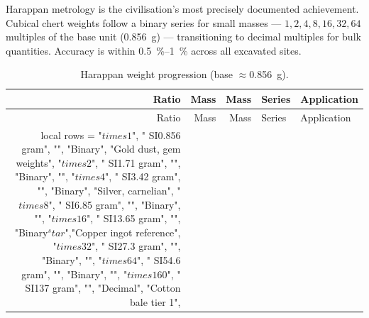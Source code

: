 Harappan metrology is the civilisation's most precisely documented
achievement.\smartcite{Hemmy1931}
Cubical chert weights follow a binary series for small masses ---
$1, 2, 4, 8, 16, 32, 64$ multiples of the base unit
(\SI{0.856}{\gram}) --- transitioning to decimal multiples for
bulk quantities.
Accuracy is within \SIrange{0.5}{1}{\percent} across all excavated
sites.\smartcite{Kenoyer2010}

\begin{longtable}{@{}rrrll@{}}
\caption{Harappan weight progression (base $\approx$\SI{0.856}{\gram}).}
\label{tab:weights}\\
\toprule
Ratio & Mass & Mass & Series & Application \\
\midrule
\endfirsthead
\toprule
Ratio & Mass & Mass & Series & Application \\
\midrule
\endhead
\bottomrule
\endlastfoot
\directlua{
local rows = {
  {"$\\times 1$",   "\\SI{0.856}{\\gram}", "",                  "Binary",         "Gold dust, gem weights"},
  {"$\\times 2$",   "\\SI{1.71}{\\gram}",  "",                  "Binary",         ""},
  {"$\\times 4$",   "\\SI{3.42}{\\gram}",  "",                  "Binary",         "Silver, carnelian"},
  {"$\\times 8$",   "\\SI{6.85}{\\gram}",  "",                  "Binary",         ""},
  {"$\\times 16$",  "\\SI{13.65}{\\gram}", "",                  "Binary$^\\star$","Copper ingot reference"},
  {"$\\times 32$",  "\\SI{27.3}{\\gram}",  "",                  "Binary",         ""},
  {"$\\times 64$",  "\\SI{54.6}{\\gram}",  "",                  "Binary",         ""},
  {"$\\times 160$", "\\SI{137}{\\gram}",   "",                  "Decimal",        "Cotton bale tier 1"},
}}
\end{longtable}
